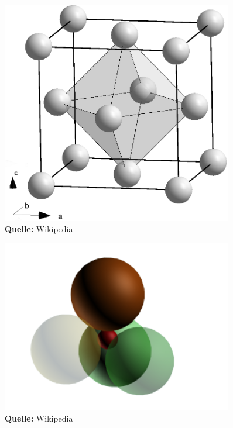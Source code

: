 \documentclass[a4paper,titlepage]{scrartcl}
\numberwithin{equation}{section}
\begin{document}
\begin{figure}[H]
\centering
\begin{minipage}{.4\textwidth}
	\centering
  	\includegraphics[width=0.9\textwidth]{images/oktaeder.png}\\
	\footnotesize\sffamily\textbf{Quelle:} Wikipedia \cite{wiki:oktaederluecke}
    \captionsetup{width=\textwidth}
    \label{fig:oktaeder}
\end{minipage}%
\begin{minipage}{.4\textwidth}
	\centering
	\includegraphics[width=0.9\textwidth]{images/tetraeder.png}\\
	\footnotesize\sffamily\textbf{Quelle:} Wikipedia \cite{wiki:tetraederluecke}
	\captionsetup{width=\textwidth}
	\label{fig:tetraeder}
\end{minipage}
\end{figure}
\end{document}
